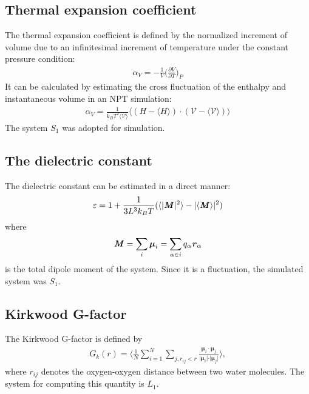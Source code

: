 \documentclass[aip,jcp,a4paper,preprint,unsortedaddress,onecolumn,fleqn]{revtex4-1}
\newcommand{\eps}{\varepsilon}
\newcommand{\vect}[1]{\textbf{\textit{#1}}}
\newcommand{\systemsb}{S_1}
\newcommand{\systemlb}{L_1}
\begin{document}
\subsection{Thermal expansion coefficient}
The thermal expansion coefficient is defined by
the normalized increment of volume due to an infinitesimal
increment of temperature under the constant pressure condition:
\begin{align}
  \alpha_V = - \frac 1V \Big(\frac{\partial V}{\partial T}\Big)_P
\end{align}
It can be calculated by estimating the cross fluctuation
of the enthalpy and instantaneous volume  in an NPT simulation:
\begin{align}
  \alpha_V = \frac{1}{k_BT^2\langle \mathcal V\rangle} \langle (H - \langle H\rangle)\cdot(\mathcal V - \langle \mathcal V\rangle) \rangle
\end{align}
The system $\systemsb$ was adopted for simulation.


\subsection{The dielectric constant}

The dielectric constant can be estimated in a direct manner:
\begin{align}
  \eps = 1 + \frac{1}{3L^3 k_BT} ( \langle \vert \vect M\vert^2\rangle - \vert\langle \vect M\rangle\vert^2 )
\end{align}
where
\begin{align}
  \vect M = \sum_i\boldsymbol\mu_i = \sum_{\alpha\in i} q_\alpha\vect r_\alpha
\end{align}
is the total dipole moment of the system. Since it is a fluctuation, the simulated system was $\systemsb$.

\subsection{Kirkwood G-factor}

The Kirkwood G-factor is defined by~\cite{vanderSpoel2006origin}
\begin{align}
  G_k(r) =
  \Big\langle
  \frac 1N
  \sum_{i=1}^N \sum_{j, r_{ij} < r}
  \frac {\boldsymbol\mu_i \cdot \boldsymbol\mu_j}{\vert \boldsymbol\mu_i\vert \cdot \vert\boldsymbol\mu_j\vert}
  \Big\rangle,
\end{align}
where $r_{ij}$ denotes the oxygen-oxygen distance between two water
molecules.  The system for computing this quantity is $\systemlb$.
\end{document}

